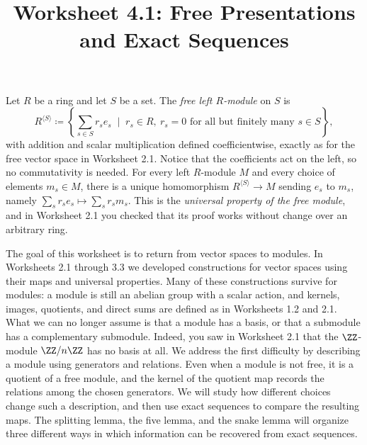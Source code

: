 \documentclass[12pt,reqno]{amsart}
\title{Worksheet 4.1: Free Presentations and Exact Sequences}
\begin{document}
\maketitle
\thispagestyle{firstpage}

Let $R$ be a ring and let $S$ be a set. The \emph{free left $R$-module} on $S$ is
\[
R^{\langle S\rangle}\coloneqq\left\{\sum_{s\in S}r_se_s \;\; \big| \;\; r_s\in R,\ r_s=0\text{ for all but finitely many }s\in S\right\},
\]
with addition and scalar multiplication defined coefficientwise, exactly as for the free vector space in Worksheet 2.1. Notice that the coefficients act on the left, so no commutativity is needed. For every left $R$-module $M$ and every choice of elements $m_s\in M$, there is a unique homomorphism $R^{\langle S\rangle}\to M$ sending $e_s$ to $m_s$, namely $\sum_sr_se_s\mapsto\sum_sr_sm_s$. This is the \emph{universal property of the free module}, and in Worksheet 2.1 you checked that its proof works without change over an arbitrary ring.

The goal of this worksheet is to return from vector spaces to modules. In Worksheets 2.1 through 3.3 we developed constructions for vector spaces using their maps and universal properties. Many of these constructions survive for modules: a module is still an abelian group with a scalar action, and kernels, images, quotients, and direct sums are defined as in Worksheets 1.2 and 2.1. What we can no longer assume is that a module has a basis, or that a submodule has a complementary submodule. Indeed, you saw in Worksheet 2.1 that the $\ZZ$-module $\ZZ/n\ZZ$ has no basis at all. We address the first difficulty by describing a module using generators and relations. Even when a module is not free, it is a quotient of a free module, and the kernel of the quotient map records the relations among the chosen generators. We will study how different choices change such a description, and then use exact sequences to compare the resulting maps. The splitting lemma, the five lemma, and the snake lemma will organize three different ways in which information can be recovered from exact sequences.
\end{document}
